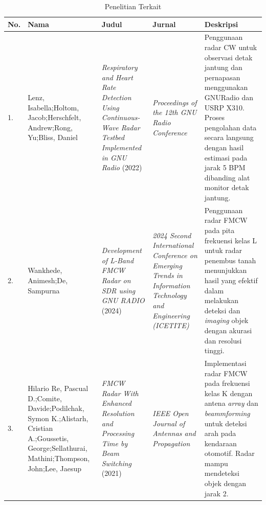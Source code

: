 \begin{center}
	\begin{longtable}{|p{0.5cm}|p{2cm}|p{3cm}|p{2.5cm}|p{4cm}|}
	\caption{Penelitian Terkait}
	\label{tab:PenelitianDulu}\\
	\hline
	\textbf{No.} & \textbf{Nama} & \textbf{Judul} &\textbf{Jurnal} & \textbf{Deskripsi}\\
	\hline
	1.& Lenz, Isabella;\newline Holtom, Jacob;\newline Herschfelt, Andrew;\newline Rong, Yu;\newline Bliss, Daniel 
	& \textit{Respiratory and Heart Rate Detection Using Continuous-Wave Radar Testbed Implemented in GNU Radio } (2022)
	& \textit{Proceedings of the 12th GNU Radio Conference}
	& Penggunaan radar CW untuk observasi detak jantung dan pernapasan menggunakan GNURadio dan USRP X310. Proses pengolahan data secara langsung dengan hasil estimasi pada jarak 5 BPM dibanding alat monitor detak jantung. 
	\\ \hline
	
	2. 	& Wankhede, Animesh;\newline De, Sampurna
	& \textit{Development of L-Band FMCW Radar on SDR using GNU RADIO} (2024)
	& \textit{2024 Second International Conference on Emerging Trends in Information Technology and Engineering (ICETITE)}
	& Penggunaan radar FMCW pada pita frekuensi kelas L untuk radar penembus tanah menunjukkan hasil yang efektif dalam melakukan deteksi dan \textit{imaging} objek dengan akurasi dan resolusi tinggi. \\ \hline
	
	3. & Hilario Re, Pascual D.;\newline Comite, Davide;\newline Podilchak, Symon K.;\newline Alistarh, Cristian A.;\newline Goussetis, George;\newline Sellathurai, Mathini;\newline Thompson, John;\newline Lee, Jaesup
	& \textit{FMCW Radar With Enhanced Resolution and Processing Time by Beam Switching} (2021)
	& \textit{IEEE Open Journal of Antennas and Propagation}
	& Implementasi radar FMCW pada frekuensi kelas K dengan antena \textit{array} dan \textit{beammforming} untuk deteksi arah pada kendaraan otomotif. Radar mampu mendeteksi objek dengan jarak 2\textdegree.
	\\ \hline
	

\end{longtable}
\end{center}
